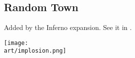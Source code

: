 \begin{multicols*}{2}
\subsection*{Random Town}
Added by the Inferno expansion. See it in .


\vfill
\hspace{2em}
\texttt{[image: \\art/implosion.png]}
\vfill

\end{multicols*}
